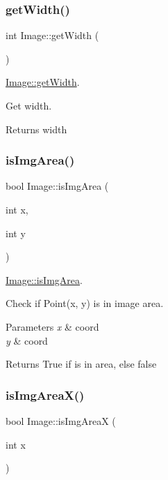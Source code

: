 \subsubsection{\texorpdfstring{getWidth()}{getWidth()}}
{\footnotesize\ttfamily int Image\+::get\+Width (\begin{DoxyParamCaption}{ }\end{DoxyParamCaption})}



\mbox{\hyperlink{class_image_af2720a072812763395512fc3c8c21362}{Image\+::get\+Width}}. 

Get width. \begin{DoxyReturn}{Returns}
width 
\end{DoxyReturn}
\mbox{\label{class_image_aaaf159e089ee155ed25a44424f428506}} 
\subsubsection{\texorpdfstring{isImgArea()}{isImgArea()}}
{\footnotesize\ttfamily bool Image\+::is\+Img\+Area (\begin{DoxyParamCaption}\item[{int}]{x,  }\item[{int}]{y }\end{DoxyParamCaption})}



\mbox{\hyperlink{class_image_aaaf159e089ee155ed25a44424f428506}{Image\+::is\+Img\+Area}}. 

Check if Point(x, y) is in image area. 
\begin{DoxyParams}{Parameters}
{\em x} & coord \\
\hline
{\em y} & coord \\
\hline
\end{DoxyParams}
\begin{DoxyReturn}{Returns}
True if is in area, else false 
\end{DoxyReturn}
\mbox{\label{class_image_a176645fd2b8695127beb87861a3bff05}} 
\subsubsection{\texorpdfstring{isImgAreaX()}{isImgAreaX()}}
{\footnotesize\ttfamily bool Image\+::is\+Img\+AreaX (\begin{DoxyParamCaption}\item[{int}]{x }\end{DoxyParamCaption})}



